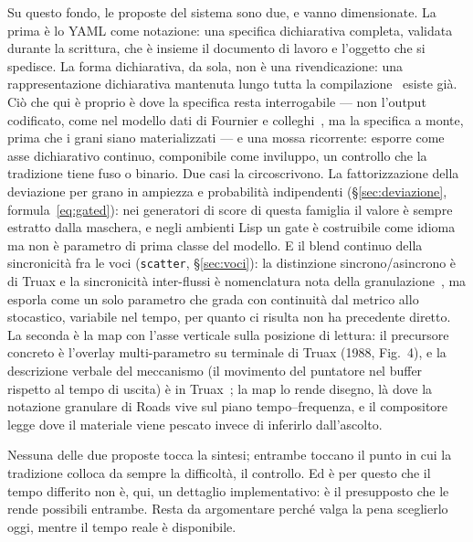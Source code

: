 Su questo fondo, le proposte del sistema sono due, e vanno dimensionate.
La prima è lo YAML come notazione: una specifica dichiarativa completa,
validata durante la scrittura, che è insieme il documento di lavoro e
l'oggetto che si spedisce. La forma dichiarativa, da sola, non è una
rivendicazione: una rappresentazione dichiarativa
mantenuta lungo tutta la compilazione~\cite{QiuIchise2025tenor} esiste
già. Ciò che qui è proprio è dove la specifica resta interrogabile ---
non l'output codificato, come nel modello dati di Fournier e
colleghi~\cite{Fournier2016tenor}, ma la specifica a monte, prima che i
grani siano materializzati --- e una mossa ricorrente: esporre come asse
dichiarativo continuo, componibile come inviluppo, un controllo che la
tradizione tiene fuso o binario. Due casi la circoscrivono. La
fattorizzazione della deviazione per grano in ampiezza e probabilità
indipendenti (\S\ref{sec:deviazione}, formula~\eqref{eq:gated}): nei
generatori di score di questa famiglia il valore è sempre estratto dalla
maschera, e negli ambienti Lisp un gate è costruibile come idioma ma non
è parametro di prima classe del modello. E il blend continuo della
sincronicità fra le voci (\texttt{scatter}, \S\ref{sec:voci}): la
distinzione sincrono/asincrono è di Truax e la sincronicità inter-flussi
è nomenclatura nota della granulazione~\cite{Dutilleux2016}, ma esporla
come un solo parametro che grada con continuità dal metrico allo
stocastico, variabile nel tempo, per quanto ci risulta non ha precedente
diretto. La seconda è la map
con l'asse verticale sulla posizione di lettura: il precursore concreto
è l'overlay multi-parametro su terminale di Truax (1988, Fig.~4), e la
descrizione verbale del meccanismo (il movimento del puntatore nel
buffer rispetto al tempo di uscita) è in
Truax~\cite{Truax1994}; la map lo rende disegno, là dove la
notazione granulare di Roads vive sul piano tempo--frequenza, e il
compositore legge dove il materiale viene pescato invece di inferirlo
dall'ascolto.

Nessuna delle due proposte tocca la sintesi; entrambe toccano il punto in
cui la tradizione colloca da sempre la difficoltà, il controllo. Ed è
per questo che il tempo differito non è, qui, un dettaglio
implementativo: è il presupposto che le rende possibili entrambe.
Resta da argomentare perché valga la pena sceglierlo oggi, mentre il
tempo reale è disponibile.



